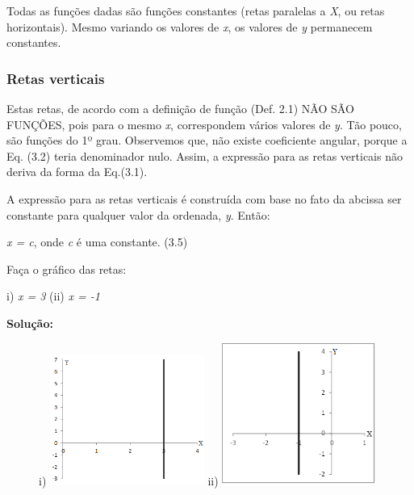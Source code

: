 Todas as funções dadas são funções constantes (retas paralelas a \textit{X}, ou retas horizontais). Mesmo variando os valores de \textit{x}, os valores de \textit{y} permanecem constantes. \qedsymbol{} 

\subsubsection{Retas verticais}

Estas retas, de acordo com a definição de função (Def. 2.1) NÃO SÃO FUNÇÕES, pois para o mesmo \textit{x}, correspondem vários valores de \textit{y}. Tão pouco, são funções do 1º grau. Observemos que, não existe coeficiente angular, porque a Eq. (3.2) teria denominador nulo. Assim, a expressão para as retas verticais não deriva da forma da Eq.(3.1). 

A expressão para as retas verticais é construída com base no fato da abcissa ser constante para qualquer valor da ordenada, \textit{y}. Então:

\begin{caixa}
\textit{x = c}, onde  \textit{c} é uma constante. \tab (3.5)
\end{caixa}

\begin{texemplo}
Faça o gráfico das retas: 

i) \textit{x = 3} \qquad (ii) \textit{x = -1}

\textbf{Solução:}

\begin{figure}[H]
	i) \includegraphics[width=0.45\textwidth]{capitulos/funcao_do_primeiro_grau/media/image18.png} 
	ii) \includegraphics[width=0.45\textwidth]{capitulos/funcao_do_primeiro_grau/media/image19.png}
\end{figure}
\end{texemplo}

